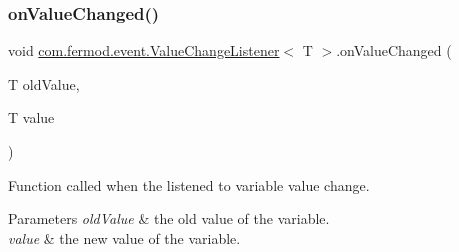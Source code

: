 \subsubsection{\texorpdfstring{onValueChanged()}{onValueChanged()}}
{\footnotesize\ttfamily void \mbox{\hyperlink{interfacecom_1_1fermod_1_1event_1_1ValueChangeListener}{com.\+fermod.\+event.\+Value\+Change\+Listener}}$<$ T $>$.on\+Value\+Changed (\begin{DoxyParamCaption}\item[{T}]{old\+Value,  }\item[{T}]{value }\end{DoxyParamCaption})}



Function called when the listened to variable value change. 


\begin{DoxyParams}{Parameters}
{\em old\+Value} & the old value of the variable. \\
\hline
{\em value} & the new value of the variable. \\
\hline
\end{DoxyParams}

